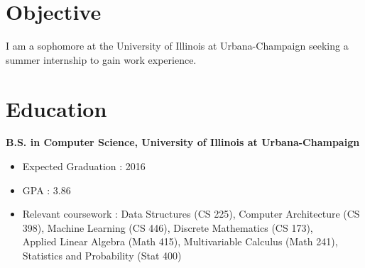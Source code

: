 \documentclass[margin]{res}
\begin{document}
 
 

\address{{\bf Present Address} \\ 512 S. 3rd St. \\ Urbana, Il 61820}
\address{{\bf Permanent Address} \\ 6147 Alcante Dr. \\ San Jose, CA 95129}

 
\begin{resume} 
 
\section{Objective} 
I am a sophomore at the University of Illinois at Urbana-Champaign seeking a summer internship to gain work experience.

\section{Education} 
{\bf B.S. in Computer Science, University of Illinois at Urbana-Champaign}
\begin{itemize} \itemsep -3pt %
\item Expected Graduation : 2016
\item GPA : 3.86
\item Relevant coursework : Data Structures (CS 225), Computer Architecture (CS 398), Machine Learning (CS 446), 
Discrete Mathematics (CS 173), \\Applied Linear Algebra (Math 415), Multivariable Calculus (Math 241), \\Statistics and Probability (Stat 400)
\end{itemize}
 


\end{resume}
\end{document}
